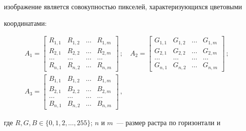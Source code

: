 изображение является совокупностью пикселей, характеризующихся цветовыми 


координатами:


      \begin{gather*}


      A_1=


      \begin{bmatrix}


      R_{1,1} & R_{1,2} &\ldots & R_{1,m}\\


      R_{2,1} & R_{2,2} &\ldots &R_{2,m}\\


      \ldots &\ldots &\ldots &\ldots\\


      R_{n,1} & R_{n,2} & \ldots & R_{n,m}


      \end{bmatrix}\,;\quad 


      A_2=


      \begin{bmatrix}


      G_{1,1} & G_{1,2} &\ldots & G_{1,m}\\


      G_{2,1} & G_{2,2} &\ldots & G_{2,m}\\


      \ldots &\ldots &\ldots &\ldots\\


      G_{n,1} & G_{n,2} & \ldots & G_{n,m}


      \end{bmatrix}\,;\\


      A_3=


      \begin{bmatrix}


      B_{1,1} & B_{1,2} &\ldots & B_{1,m}\\


      B_{2,1} & B_{2,2} &\ldots & B_{2,m}\\


      \ldots &\ldots &\ldots &\ldots\\


      B_{n,1} & B_{n,2} & \ldots & B _{n,m}


      \end{bmatrix}\,,


      \end{gather*}


где  $R,G,B \in \{0,1,2,\ldots ,255\}$; $n$ и $m$~--- размер растра по горизонтали и 


